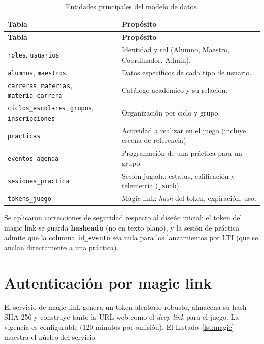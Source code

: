 \documentclass[12pt,letterpaper,oneside]{report}
\begin{document}
\begin{longtable}{p{3.6cm} p{10cm}}
\caption{Entidades principales del modelo de datos.}\label{tab:tablas}\\
\toprule
\textbf{Tabla} & \textbf{Propósito} \\
\midrule
\endfirsthead
\toprule \textbf{Tabla} & \textbf{Propósito} \\ \midrule
\endhead
\texttt{roles}, \texttt{usuarios} & Identidad y rol (Alumno, Maestro, Coordinador, Admin). \\
\texttt{alumnos}, \texttt{maestros} & Datos específicos de cada tipo de usuario. \\
\texttt{carreras}, \texttt{materias}, \texttt{materia\_carrera} & Catálogo académico y su relación. \\
\texttt{ciclos\_escolares}, \texttt{grupos}, \texttt{inscripciones} & Organización por ciclo y grupo. \\
\texttt{practicas} & Actividad a realizar en el juego (incluye escena de referencia). \\
\texttt{eventos\_agenda} & Programación de una práctica para un grupo. \\
\texttt{sesiones\_practica} & Sesión jugada: estatus, calificación y telemetría (\texttt{jsonb}). \\
\texttt{tokens\_juego} & Magic link: \emph{hash} del token, expiración, uso. \\
\bottomrule
\end{longtable}

Se aplicaron correcciones de seguridad respecto al diseño inicial: el token del
magic link se guarda \textbf{hasheado} (no en texto plano), y la sesión de
práctica admite que la columna \texttt{id\_evento} sea nula para los lanzamientos
por LTI (que se anclan directamente a una práctica).

\section{Autenticación por magic link}
El servicio de magic link genera un token aleatorio robusto, almacena su hash
SHA-256 y construye tanto la URL web como el \emph{deep link} para el juego. La
vigencia es configurable (120 minutos por omisión). El
Listado~\ref{lst:magic} muestra el núcleo del servicio.
\end{document}

